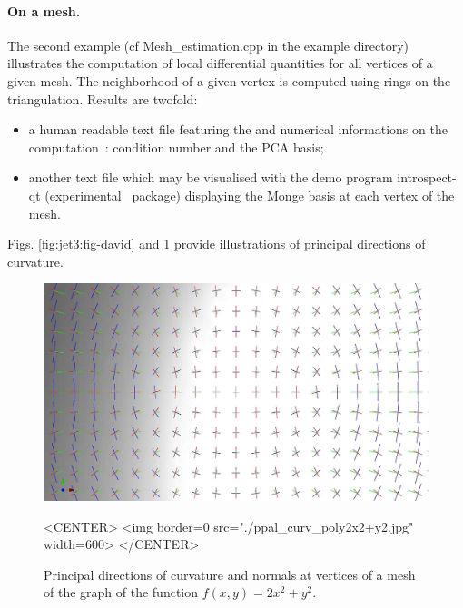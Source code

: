 \paragraph{On a mesh.}
The second example (cf Mesh_estimation.cpp in the example directory)
illustrates the computation of local differential quantities for all
vertices of a given mesh. The neighborhood of a given vertex is
computed using rings on the triangulation. Results are twofold:
\begin{itemize}
\item
a human readable text file featuring the  and
numerical informations on the computation~: condition number and the
PCA basis;
\item another text file which may be visualised with the demo program
  introspect-qt (experimental \cgal\ package) displaying the Monge
  basis at each vertex of the mesh.
\end{itemize}



Figs.
\ref{fig:jet3:fig-david} and
\ref{fig:jet3:fig-elliptic-paraboloid}
provide illustrations of principal directions of curvature.



 

\begin{figure}[!ht]
\begin{ccTexOnly}
\centerline{
\includegraphics[width=.5\linewidth]{Jet_fitting_3/ppal_curv_poly2x2+y2}}
\end{ccTexOnly}
\caption{Principal directions of curvature and normals at vertices of a mesh of the
 graph of the function $f(x,y)=2x^2+y^2$.}

\begin{ccHtmlOnly}
<CENTER> <img border=0 src="./ppal_curv_poly2x2+y2.jpg" width=600>
</CENTER>
\end{ccHtmlOnly}
\label{fig:jet3:fig-elliptic-paraboloid}
\end{figure}
  

